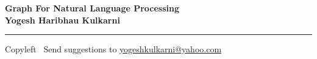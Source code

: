 
\graphicspath{{images/}}

\footnotesize


\begin{center}
\Large{\textbf{Graph For Natural Language Processing\\ Yogesh Haribhau Kulkarni}}  
\end{center}

\begin{multicols}{2}

\end{multicols}

\rule{\linewidth}{0.25pt}
\scriptsize
Copyleft \textcopyleft\  Send suggestions to 
\href{http://www.yogeshkulkarni.com}{yogeshkulkarni@yahoo.com}


